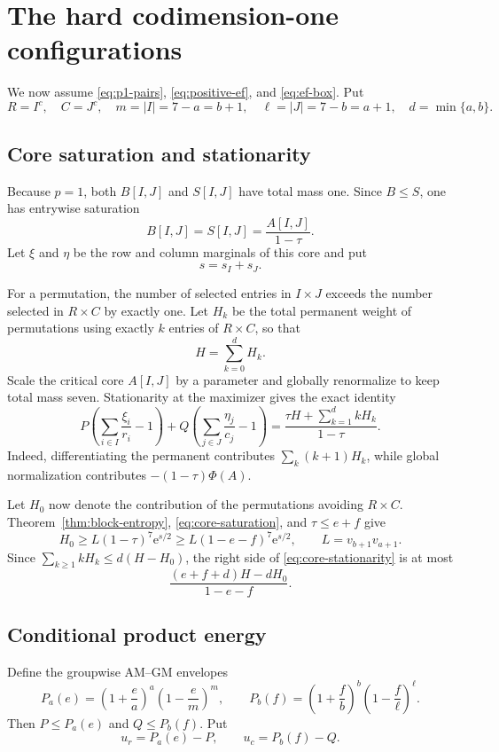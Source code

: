 \documentclass[11pt]{article}
\theoremstyle{definition}
\newcommand{\e}{\mathrm e}
\begin{document}
\section{The hard codimension-one configurations}

We now assume \eqref{eq:p1-pairs}, \eqref{eq:positive-ef}, and \eqref{eq:ef-box}.  Put
\[
 R=I^c,
 \quad C=J^c,
 \quad m=|I|=7-a=b+1,
 \quad \ell=|J|=7-b=a+1,
 \quad d=\min\{a,b\}.
\]

\subsection{Core saturation and stationarity}

Because $p=1$, both $B[I,J]$ and $S[I,J]$ have total mass one.  Since $B\le S$, one has entrywise saturation
\[
 B[I,J]=S[I,J]=\frac{A[I,J]}{1-\tau}.
 \tag{5.1}\label{eq:core-saturation}
\]
Let $\xi$ and $\eta$ be the row and column marginals of this core and put
\[
 s=s_I+s_J.
 \tag{5.2}\label{eq:s-total}
\]

For a permutation, the number of selected entries in $I\times J$ exceeds the number selected in $R\times C$ by exactly one.  Let $H_k$ be the total permanent weight of permutations using exactly $k$ entries of $R\times C$, so that
\[
 H=\sum_{k=0}^dH_k.
\]
Scale the critical core $A[I,J]$ by a parameter and globally renormalize to keep total mass seven.  Stationarity at the maximizer gives the exact identity
\[
 P\left(\sum_{i\in I}\frac{\xi_i}{r_i}-1\right)
 +Q\left(\sum_{j\in J}\frac{\eta_j}{c_j}-1\right)
 =\frac{\tau H+\sum_{k=1}^d kH_k}{1-\tau}.
 \tag{5.3}\label{eq:core-stationarity}
\]
Indeed, differentiating the permanent contributes $\sum_k(k+1)H_k$, while global normalization contributes $-(1-\tau)\Phi(A)$.

Let $H_0$ now denote the contribution of the permutations avoiding $R\times C$.  Theorem~\ref{thm:block-entropy}, \eqref{eq:core-saturation}, and $\tau\le e+f$ give
\[
 H_0\ge L(1-\tau)^7\e^{s/2}
 \ge L(1-e-f)^7\e^{s/2},
 \qquad
 L=v_{b+1}v_{a+1}.
 \tag{5.4}\label{eq:H0-lower}
\]
Since $\sum_{k\ge1}kH_k\le d(H-H_0)$, the right side of \eqref{eq:core-stationarity} is at most
\[
 \frac{(e+f+d)H-dH_0}{1-e-f}.
 \tag{5.5}\label{eq:stationarity-upper}
\]

\subsection{Conditional product energy}

Define the groupwise AM--GM envelopes
\[
 P_a(e)=\left(1+\frac ea\right)^a
        \left(1-\frac e{m}\right)^m,
 \qquad
 P_b(f)=\left(1+\frac fb\right)^b
        \left(1-\frac f{\ell}\right)^\ell.
 \tag{5.6}\label{eq:PaPb}
\]
Then $P\le P_a(e)$ and $Q\le P_b(f)$.  Put
\[
 u_r=P_a(e)-P,
 \qquad
 u_c=P_b(f)-Q.
\]
\end{document}

